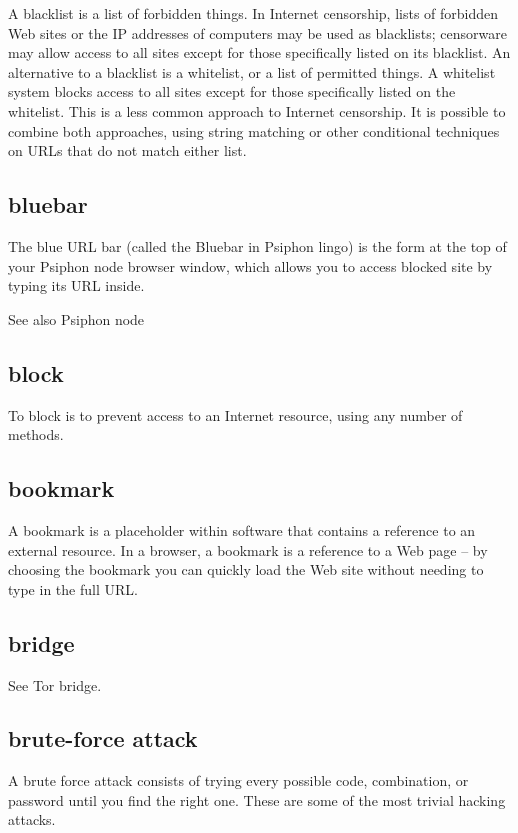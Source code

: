 A blacklist is a list of forbidden things. In Internet censorship, lists
of forbidden Web sites or the IP addresses of computers may be used as
blacklists; censorware may allow access to all sites except for those
specifically listed on its blacklist. An alternative to a blacklist is a
whitelist, or a list of permitted things. A whitelist system blocks
access to all sites except for those specifically listed on the
whitelist. This is a less common approach to Internet censorship. It is
possible to combine both approaches, using string matching or other
conditional techniques on URLs that do not match either list.

\subsection{bluebar}

The blue URL bar (called the Bluebar in Psiphon lingo) is the form at
the top of your Psiphon node browser window, which allows you to access
blocked site by typing its URL inside.

See also Psiphon node

\subsection{block}

To block is to prevent access to an Internet resource, using any number
of methods.

\subsection{bookmark}

A bookmark is a placeholder within software that contains a reference to
an external resource. In a browser, a bookmark is a reference to a Web
page -- by choosing the bookmark you can quickly load the Web site
without needing to type in the full URL.

\subsection{bridge}

See Tor bridge.

\subsection{brute-force attack}

A brute force attack consists of trying every possible code,
combination, or password until you find the right one. These are some of
the most trivial hacking attacks.

